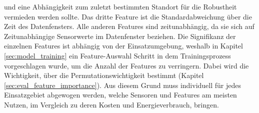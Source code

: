 und eine Abhängigkeit zum zuletzt bestimmten Standort für die Robustheit vermieden werden sollte.
\newpage
Das dritte Feature ist die Standardabweichung über die Zeit des Datenfensters.
Alle anderen Features sind zeitunabhängig, da sie sich auf Zeitunabhängige Sensorwerte im Datenfenster beziehen.
\newline
\newline
Die Signifikanz der einzelnen Features ist abhängig von der Einsatzumgebung, weshalb in Kapitel \ref{sec:model_training}
ein Feature-Auswahl Schritt in dem Trainingsprozess vorgeschlagen wurde, um die Anzahl der Features zu verringern.
Dabei wird die Wichtigkeit, über die Permutationswichtigkeit bestimmt (Kapitel \ref{sec:eval_feature_importance}).
Aus diesem Grund muss individuell für jedes Einsatzgebiet abgewogen werden, welche Sensoren und Features am meisten Nutzen,
im Vergleich zu deren Kosten und Energieverbrauch, bringen.
